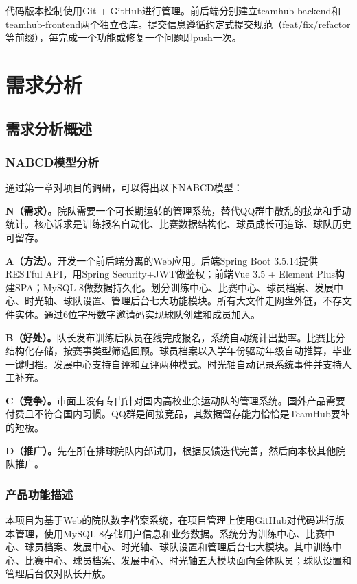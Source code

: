 \documentclass[12pt,a4paper]{ctexart}
\begin{document}
代码版本控制使用Git + GitHub进行管理。前后端分别建立teamhub-backend和teamhub-frontend两个独立仓库。提交信息遵循约定式提交规范（feat/fix/refactor等前缀），每完成一个功能或修复一个问题即push一次。


\newpage
\section{需求分析}

\subsection{需求分析概述}

\subsubsection{NABCD模型分析}

通过第一章对项目的调研，可以得出以下NABCD模型：

\textbf{N（需求）。}院队需要一个可长期运转的管理系统，替代QQ群中散乱的接龙和手动统计。核心诉求是训练报名自动化、比赛数据结构化、球员成长可追踪、球队历史可留存。

\textbf{A（方法）。}开发一个前后端分离的Web应用。后端Spring Boot 3.5.14提供RESTful API，用Spring Security+JWT做鉴权；前端Vue 3.5 + Element Plus构建SPA；MySQL 8做数据持久化。划分训练中心、比赛中心、球员档案、发展中心、时光轴、球队设置、管理后台七大功能模块。所有大文件走网盘外链，不存文件实体。通过6位字母数字邀请码实现球队创建和成员加入。

\textbf{B（好处）。}队长发布训练后队员在线完成报名，系统自动统计出勤率。比赛比分结构化存储，按赛事类型筛选回顾。球员档案以入学年份驱动年级自动推算，毕业一键归档。发展中心支持自评和互评两种模式。时光轴自动记录系统事件并支持人工补充。

\textbf{C（竞争）。}市面上没有专门针对国内高校业余运动队的管理系统。国外产品需要付费且不符合国内习惯。QQ群是间接竞品，其数据留存能力恰恰是TeamHub要补的短板。

\textbf{D（推广）。}先在所在排球院队内部试用，根据反馈迭代完善，然后向本校其他院队推广。

\subsubsection{产品功能描述}

本项目为基于Web的院队数字档案系统，在项目管理上使用GitHub对代码进行版本管理，使用MySQL 8存储用户信息和业务数据。系统分为训练中心、比赛中心、球员档案、发展中心、时光轴、球队设置和管理后台七大模块。其中训练中心、比赛中心、球员档案、发展中心、时光轴五大模块面向全体队员；球队设置和管理后台仅对队长开放。
\end{document}
